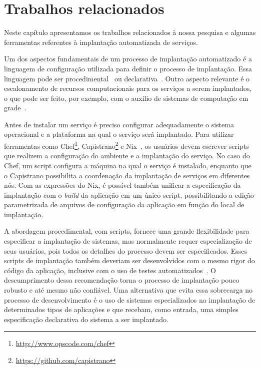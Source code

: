 
\chapter{Trabalhos relacionados}
\label{cap:relacionados}

Neste capítulo apresentamos os trabalhos relacionados à nossa pesquisa e algumas ferramentas 
referentes à implantação automatizada de serviços. 

Um dos aspectos fundamentais de um processo de implantação automatizado é a linguagem de configuração utilizada para definir o processo de implantação. Essa linguagem pode ser procedimental~\cite{Dolstra2005Configuration} ou declarativa~\cite{Magee1996Dynamic, Balter1998Olan}. Outro aspecto relevante é o escalonamento de recursos computacionais para os serviços a serem implantados, o que pode ser feito, por exemplo, com o auxílio de sistemas de computação em grade~\cite{Watson2006Dynasoar}.

Antes de instalar um serviço é preciso configurar adequadamente o sistema operacional e a plataforma na qual o serviço será implantado. Para utilizar ferramentas como Chef\footnote{\url{http://www.opscode.com/chef}}, Capistrano\footnote{\url{https://github.com/capistrano}} e Nix~\cite{Dolstra2005Configuration}, os usuários devem escrever scripts que realizem a configuração do ambiente e a implantação do serviço. No caso do Chef, um script configura a máquina na qual o serviço é instalado, enquanto que o Capistrano possibilita a coordenação da implantação de serviços em diferentes nós. Com as expressões do Nix, é possível também unificar a especificação da implantação com o \textit{build} da aplicação em um único script, possibilitando a edição parametrizada de arquivos de configuração da aplicação em função do local de implantação. 


A abordagem procedimental, com scripts, fornece uma grande 
flexibilidade para especificar a implantação de sistemas, 
mas normalmente requer especialização de seus usuários, 
pois todos os detalhes do processo devem ser especificados. 
Esses scripts de implantação também deveriam ser desenvolvidos com o mesmo rigor do código da aplicação, inclusive com o uso de testes automatizados~\cite{Humble2011Continuous}. O descumprimento dessa recomendação torna o processo de implantação pouco robusto e até mesmo não confiável. Uma alternativa que evita essa sobrecarga no processo de desenvolvimento é o uso de sistemas especializados na implantação de determinados tipos de aplicações e que recebam, como entrada, uma simples especificação declarativa do sistema a ser implantado.

